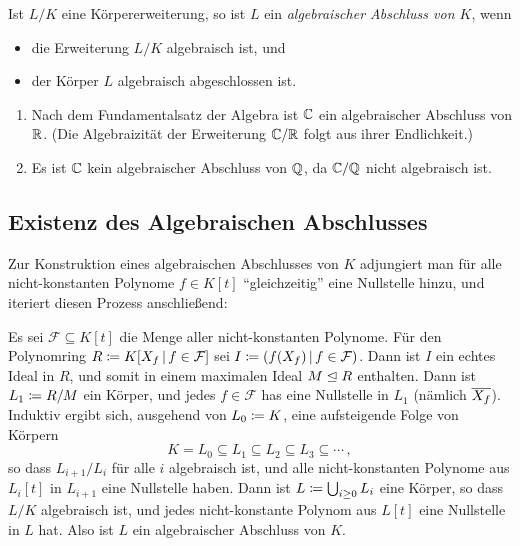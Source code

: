 \begin{definition}
  Ist $L/K$ eine Körpererweiterung, so ist $L$ ein \emph{algebraischer Abschluss von $K$}, wenn
  \begin{itemize}
    \item
      die Erweiterung $L/K$ algebraisch ist, und
    \item
      der Körper $L$ algebraisch abgeschlossen ist.
  \end{itemize}
\end{definition}

\begin{example}
  \begin{enumerate}
    \item
      Nach dem Fundamentalsatz der Algebra ist $\mathbb{C}$ ein algebraischer Abschluss von $\mathbb{R}$.
      (Die Algebraizität der Erweiterung $\mathbb{C}/\mathbb{R}$ folgt aus ihrer Endlichkeit.)
    \item
      Es ist $\mathbb{C}$ kein algebraischer Abschluss von $\mathbb{Q}$, da $\mathbb{C}/\mathbb{Q}$ nicht algebraisch ist.
  \end{enumerate}
\end{example}



\subsection{Existenz des Algebraischen Abschlusses}

Zur Konstruktion eines algebraischen Abschlusses von $K$ adjungiert man für alle nicht-konstanten Polynome $f \in K[t]$ \enquote{gleichzeitig} eine Nullstelle hinzu, und iteriert diesen Prozess anschließend:

Es sei $\mathcal{F} \subseteq K[t]$ die Menge aller nicht-konstanten Polynome.
Für den Polynomring $R \defined K[X_f \suchthat f \in \mathcal{F}]$ sei $I \defined \genideal{f(X_f) \suchthat f \in \mathcal{F}}$.
Dann ist $I$ ein echtes Ideal in $R$, und somit in einem maximalen Ideal $M \mathrel{\trianglelefteq} R$ enthalten.
Dann ist $L_1 \coloneqq R/M$ ein Körper, und jedes $f \in \mathcal{F}$ has eine Nullstelle in $L_1$ (nämlich $\overline{X_f}$).
Induktiv ergibt sich, ausgehend von $L_0 \coloneqq K$, eine aufsteigende Folge von Körpern
\[
            K
  =         L_0
  \subseteq L_1
  \subseteq L_2
  \subseteq L_3
  \subseteq \dotsb \,,
\]
so dass $L_{i+1}/L_i$ für alle $i$ algebraisch ist, und alle nicht-konstanten Polynome aus $L_i[t]$ in $L_{i+1}$ eine Nullstelle haben.
Dann ist $L \coloneqq \bigcup_{i \geq 0} L_i$ eine Körper, so dass $L/K$ algebraisch ist, und jedes nicht-konstante Polynom aus $L[t]$ eine Nullstelle in $L$ hat.
Also ist $L$ ein algebraischer Abschluss von $K$.

